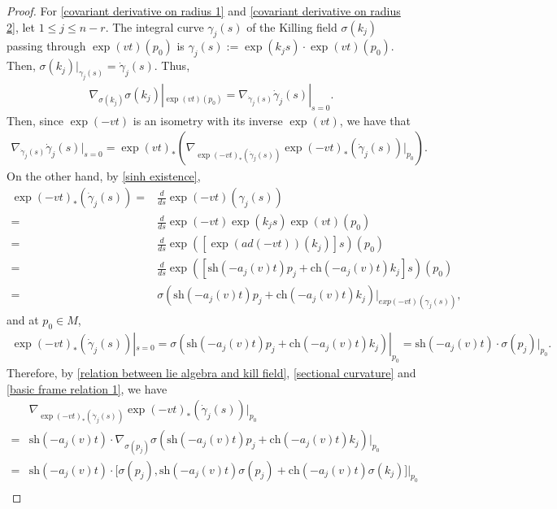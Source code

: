 \documentclass[10pt,a4paper]{amsart}
\begin{document}
\begin{proof}
    For \eqref{covariant derivative on radius 1} and \eqref{covariant derivative on radius 2}, let $1 \leq j \leq n - r$. The integral curve $\gamma_j(s)$ of the Killing field $\sigma(k_j)$ passing through $\exp(vt)(p_0)$ is $\gamma_j(s) := \exp(k_js)\cdot \exp(vt)(p_0)$. Then, $\sigma(k_j)|_{\gamma_j(s)} = \dot\gamma_j(s)$. Thus, 
    \begin{align*}
        \nabla_{\sigma(k_j)}\sigma(k_j)|_{\exp(vt)(p_0)} = \nabla_{\dot\gamma_j(s)}\dot\gamma_j(s)|_{s = 0}.
    \end{align*}
    Then, since $\exp(-vt)$ is an isometry with its inverse $\exp(vt)$, we have that 
    \begin{align*}
        \nabla_{\dot\gamma_j(s)}\dot\gamma_j(s)|_{s = 0} = \exp(vt)_* (\nabla_{\exp(-vt)_*(\dot\gamma_j(s))}\exp(-vt)_*(\dot\gamma_j(s))|_{p_0}).
    \end{align*}
    On the other hand, by \eqref{sinh existence},
    \begin{align*}
        \exp(-vt)_*(\dot\gamma_j(s)) 
        =& \frac{d}{ds}\exp(-vt)(\gamma_j(s))\\
        =& \frac{d}{ds}\exp(-vt)\exp(k_j s)\exp(vt)(p_0)\\
        =& \frac{d}{ds} \exp([\exp(ad(-vt))(k_j)]s)(p_0)\\
        =& \frac{d}{ds} \exp([\mathrm{sh}(-a_j(v)t)p_j + \mathrm{ch}(-a_j(v)t)k_j]s)(p_0)\\
        =& \sigma(\mathrm{sh}(-a_j(v)t)p_j + \mathrm{ch}(-a_j(v)t)k_j)|_{exp(-vt)(\gamma_j(s))},
    \end{align*}
    and at $p_0 \in M$, 
    \begin{align*}
        \exp(-vt)_*(\dot\gamma_j(s))|_{s = 0} = \sigma(\mathrm{sh}(-a_j(v)t)p_j + \mathrm{ch}(-a_j(v)t)k_j)|_{p_0} = \mathrm{sh}(-a_j(v)t)\cdot\sigma(p_j)|_{p_0}.
    \end{align*}
    Therefore, by \eqref{relation between lie algebra and kill field}, \eqref{sectional curvature} and \eqref{basic frame relation 1}, we have  
    \begin{align*}
        &\nabla_{\exp(-vt)_*(\dot\gamma_j(s))}\exp(-vt)_*(\dot\gamma_j(s))|_{p_0}\\
        =& \mathrm{sh}(-a_j(v)t)\cdot\nabla_{\sigma(p_j)}\sigma(\mathrm{sh}(-a_j(v)t)p_j + \mathrm{ch}(-a_j(v)t)k_j)|_{p_0}\\
        =& \mathrm{sh}(-a_j(v)t)\cdot\Big[\sigma(p_j), \mathrm{sh}(-a_j(v)t)\sigma(p_j) + \mathrm{ch}(-a_j(v)t)\sigma(k_j)\Big]\Big|_{p_0}\\

\end{align*}
\end{proof}
\end{document}
